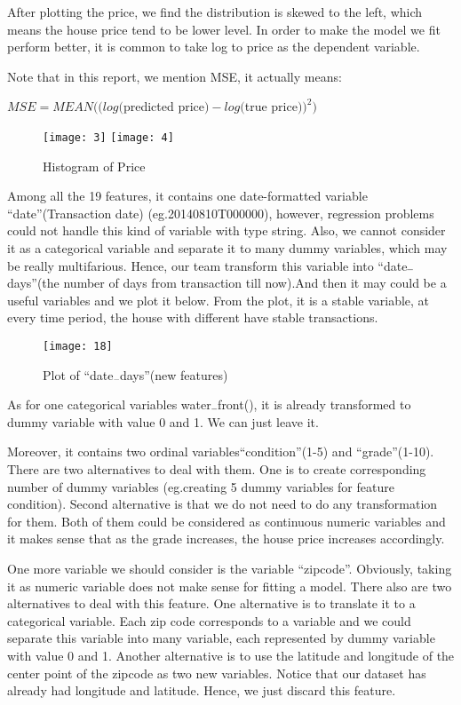 \documentclass[12pt,twocolumn,twoside]{article}
\begin{document}
After plotting the price, we find the distribution is skewed to the left, which means the house price tend to be lower level. In order to make the model we fit perform better, it is common to take log to price as the dependent variable.

Note that in this report, we mention MSE, it actually means:\\
\begin{center}
$MSE=MEAN((log($predicted price$)- log($true price$))^2)$
\end{center}
\begin{figure}[h]
\texttt{[image: 3]}
\texttt{[image: 4]}
\caption{Histogram of Price}
\end{figure}
Among all the 19 features, it contains one date-formatted variable “date”(Transaction date) (eg.20140810T000000), however, regression problems could not handle this kind of variable with type string. Also, we cannot consider it as a categorical variable and separate it to many dummy variables, which may be really multifarious. Hence, our team transform this variable into “date$\rule{0.15cm}{0.1mm}$days”(the number of days from transaction till now).And then it may could be a useful variables and we plot it below. From the plot, it is a stable variable, at every time period, the house with different have stable transactions.
\begin{figure}[h]
\texttt{[image: 18]}
\caption{Plot of “date$\rule{0.15cm}{0.1mm}$days”(new features)}
\end{figure}
As for one categorical variables water$\rule{0.15cm}{0.1mm}$front(), it is already transformed to dummy variable with value 0 and 1. We can just leave it. 

Moreover, it contains two ordinal variables“condition”(1-5) and “grade”(1-10). There are two alternatives to deal with them. One is to create corresponding number of dummy variables (eg.creating 5 dummy variables for feature condition). Second alternative is that we do not need to do any transformation for them. Both of them could be considered as continuous numeric variables and it makes sense that as the grade increases, the house price increases accordingly.

One more variable we should consider is the variable “zipcode”. Obviously, taking it as numeric variable does not make sense for fitting a model. There also are two alternatives to deal with this feature. One alternative is to translate it to a categorical variable. Each zip code corresponds to a variable and we could separate this variable into many variable, each represented by dummy variable with value 0 and 1. Another alternative is to use the latitude and longitude of the center point of the zipcode as two new variables. Notice that our dataset has already had longitude and latitude. Hence, we just discard this feature.
\end{document}
